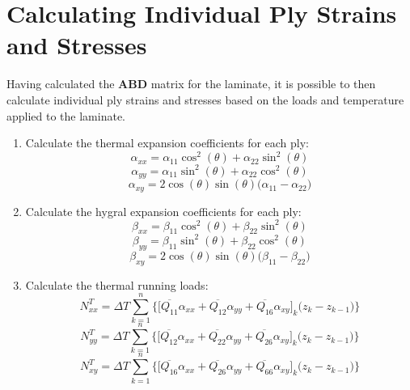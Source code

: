 \documentclass{article}
\begin{document}
\section{Calculating Individual Ply Strains and Stresses}
Having calculated the $\bm{ABD}$ matrix for the laminate, it is possible to then calculate individual ply strains and stresses based on the loads and temperature applied to the laminate.
\begin{enumerate}
    \item Calculate the thermal expansion coefficients for each ply:
    \begin{equation}
        \alpha_{xx} = \alpha_{11} \cos^{2}(\theta) + \alpha_{22} \sin^{2}(\theta)
    \end{equation}
    \begin{equation}
        \alpha_{yy} = \alpha_{11} \sin^{2}(\theta) + \alpha_{22} \cos^{2}(\theta)
    \end{equation}
    \begin{equation}
        \alpha_{xy} = 2\cos(\theta)\sin(\theta)\big(\alpha_{11} - \alpha_{22})
    \end{equation}

    \item Calculate the hygral expansion coefficients for each ply:
    \begin{equation}
        \beta_{xx} = \beta_{11} \cos^{2}(\theta) + \beta_{22} \sin^{2}(\theta)
    \end{equation}
    \begin{equation}
        \beta_{yy} = \beta_{11} \sin^{2}(\theta) + \beta_{22} \cos^{2}(\theta)
    \end{equation}
    \begin{equation}
        \beta_{xy} = 2\cos(\theta)\sin(\theta)\big(\beta_{11} - \beta_{22})
    \end{equation}

    \item Calculate the thermal running loads:
    \begin{equation}
        N_{xx}^{T} = \Delta T \sum_{k=1}^{n} \Big\{\big[\overline{Q_{11}}\alpha_{xx} + \overline{Q_{12}}\alpha_{yy} + \overline{Q_{16}}\alpha_{xy}\big]_{k}\big(z_{k} - z_{k-1}\big)\Big\}
    \end{equation}
    \begin{equation}
        N_{yy}^{T} = \Delta T \sum_{k=1}^{n} \Big\{\big[\overline{Q_{12}}\alpha_{xx} + \overline{Q_{22}}\alpha_{yy} + \overline{Q_{26}}\alpha_{xy}\big]_{k}\big(z_{k} - z_{k-1}\big)\Big\}
    \end{equation}
    \begin{equation}
        N_{xy}^{T} = \Delta T \sum_{k=1}^{n} \Big\{\big[\overline{Q_{16}}\alpha_{xx} + \overline{Q_{26}}\alpha_{yy} + \overline{Q_{66}}\alpha_{xy}\big]_{k}\big(z_{k} - z_{k-1}\big)\Big\}
    \end{equation}


\end{enumerate}
\end{document}
